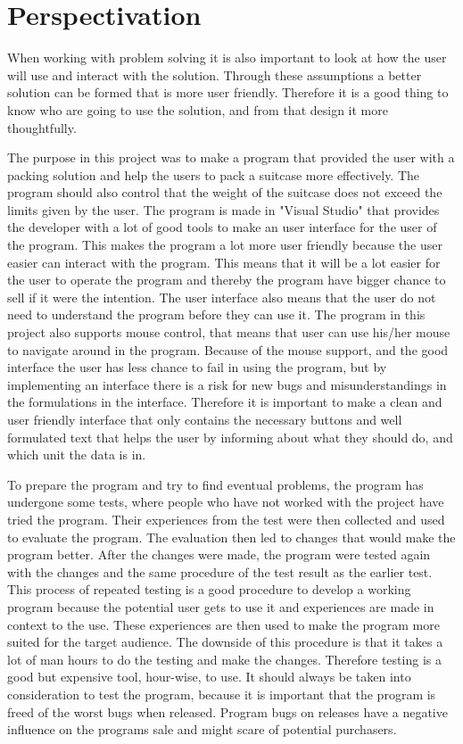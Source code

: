 \section{Perspectivation}
When working with problem solving it is also important to look at how the user will use and interact with the solution. Through these assumptions a better solution can be formed that is more user friendly. Therefore it is a good thing to know who are going to use the solution, and from that design it more thoughtfully.

The purpose in this project was to make a program that provided the user with a packing solution and help the users to pack a suitcase more effectively. The program should also control that the weight of the suitcase does not exceed the limits given by the user. The program is made in "Visual Studio" that provides the developer with a lot of good tools to make an user interface for the user of the program.
This makes the program a lot more user friendly because the user easier can interact with the program. This means that it will be a lot easier for the user to operate the program and thereby the program have bigger chance to sell if it were the intention.
The user interface also means that the user do not need to understand the program before they can use it.
The program in this project also supports mouse control, that means that user can use his/her mouse to navigate around in the program. Because of the mouse support, and the good interface the user has less chance to fail in using the program, but by implementing an interface there is a risk for new bugs and misunderstandings in the formulations in the interface.
Therefore it is important to make a clean and user friendly interface that only contains the necessary buttons and well formulated text that helps the user by informing about what they should do, and which unit the data is in.

To prepare the program and try to find eventual problems, the program has undergone some tests, where people who have not worked with the project have tried the program. Their experiences from the test were then collected and used to evaluate the program. The evaluation then led to changes that would make the program better. After the changes were made, the program were tested again with the changes and the same procedure of the test result as the earlier test.
This process of repeated testing is a good procedure to develop a working program because the potential user gets to use it and experiences are made in context to the use. These experiences are then used to make the program more suited for the target audience. The downside of this procedure is that it takes a lot of man hours to do the testing and make the changes. Therefore testing is a good but expensive tool, hour-wise, to use.
It should always be taken into consideration to test the program, because it is important that the program is freed of the worst bugs when released. Program bugs on releases have a negative influence on the programs sale and might scare of potential purchasers.


